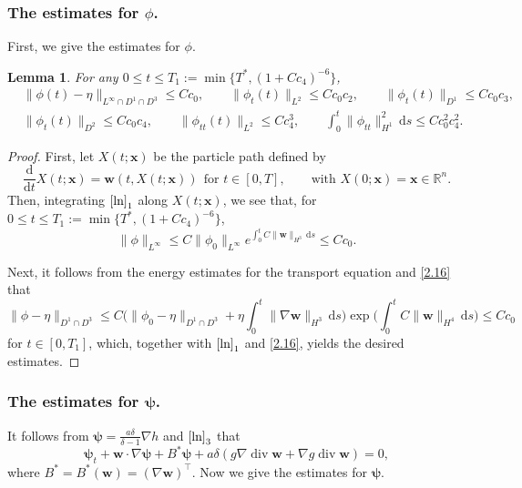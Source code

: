 \documentclass[11pt,reqno]{amsart}
\DeclareMathOperator{\diver}{\mathrm{div}}
\newtheorem{lem}{Lemma}[section]
\numberwithin{rk}{section}
\numberwithin{prop}{section}
\numberwithin{mydef}{section}
\numberwithin{lem}{section}
\numberwithin{equation}{section}
\numberwithin{thm}{section}
\begin{document}
\smallskip
\subsubsection{The  estimates for $\phi$.}

First, we give the estimates for $\phi$.
\begin{lem}\label{phiphi}
For any $0\leq t\leq T_1:=\min\{T^*,(1+Cc_4)^{-6}\}$,
\begin{equation*} 
\begin{aligned}
&\|\phi(t)-\eta\|_{L^\infty\cap D^1\cap D^3}\leq Cc_0,\qquad\|\phi_t(t)\|_{L^2}\leq Cc_0c_2,\qquad\|\phi_t(t)\|_{D^1}\leq Cc_0c_3,\\
&\|\phi_t(t)\|_{D^2}\leq Cc_0c_4,\qquad\|\phi_{tt}(t)\|_{L^2}\leq Cc_4^3,\qquad\int^t_0\|\phi_{tt}\|^2_{H^1} \,\mathrm{d}s\leq Cc_0^2c_4^2.
\end{aligned}
\end{equation*}
\end{lem}
\begin{proof} 
First, let   $X(t;\boldsymbol{x})$  be the particle path defined by
\begin{equation}\label{characteristic}
\frac{\mathrm{d}}{\mathrm{d}t}X(t;\boldsymbol{x})=\boldsymbol{w}(t,X(t; \boldsymbol{x})) \ \ \text{for $t\in [0,T]$},\qquad\text{with $X(0;\boldsymbol{x})=\boldsymbol{x} \in \mathbb{R}^n$}.
\end{equation}
Then, integrating $\eqref{ln}_1$ along $X(t; \boldsymbol{x})$, we see that, 
for $0\leq t\leq T_1:=\min\{T^*,(1+Cc_4)^{-6}\}$,
\begin{equation*} 
\|\phi\|_{L^\infty}\leq C\|\phi_0\|_{L^\infty}e^{ \int_0^tC\|\boldsymbol{w}\|_{H^3} \,\mathrm{d}s} \leq Cc_0.         
\end{equation*}

Next, it follows from the energy estimates  for the transport equation 
and \eqref{2.16} that
\begin{equation*}
\|\phi-\eta\|_{D^1\cap D^3}\leq C\Big(\|\phi_0-\eta\|_{D^1\cap D^3}+\eta\int^t_0\|\nabla \boldsymbol{w}\|_{H^3}\,\mathrm{d}s\Big)\exp\Big(\int^t_0C\|\boldsymbol{w}\|_{H^4} \,\mathrm{d}s\Big)
\leq Cc_0
\end{equation*}
for $t\in[0, T_1]$, which, together with $\eqref{ln}_1$ and \eqref{2.16},  yields the desired estimates.
\end{proof}

\smallskip
\subsubsection{The  estimates for $\boldsymbol{\psi}$.}
 It follows from  $\boldsymbol{\psi}=\frac{a\delta}{\delta-1}\nabla h$  and   $\eqref{ln}_3$ that 
\begin{equation}\label{psieq}
\boldsymbol{\psi}_t+ \boldsymbol{w}\cdot \nabla\boldsymbol{\psi}+B^* \boldsymbol{\psi}+a\delta ( g\nabla \diver \boldsymbol{w} +\nabla g \diver \boldsymbol{w} ) =0,
\end{equation}
where $B^*=B^*(\boldsymbol{w})=(\nabla \boldsymbol{w})^\top$. Now we give the estimates for $\boldsymbol{\psi}$.
\end{document}
